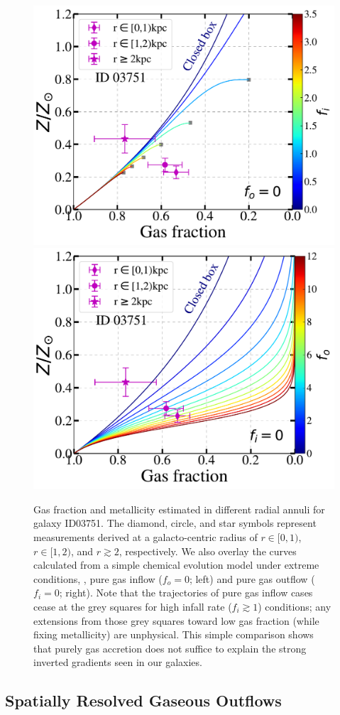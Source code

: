 \begin{figure}
    \includegraphics[width=.5\textwidth]{fig/Zerb_fgas_fixf_o.pdf}
    \includegraphics[width=.5\textwidth]{fig/Zerb_fgas_fixf_i.pdf}
    \caption[Gas fraction and metallicity estimated in different radial annuli.]
    {Gas fraction and metallicity estimated in different radial annuli for galaxy ID03751.
    The diamond, circle, and star symbols represent measurements derived at a galacto-centric radius of $r\in[0,1)$\kpc,
    $r\in[1,2)$\kpc, and $r\gtrsim2$\kpc, respectively.
    We also overlay the curves calculated from a simple chemical evolution model \cite{Erb:2008di} under extreme conditions, \ie,
    pure gas inflow ($f_o=0$; left) and pure gas outflow ($f_i=0$; right).
    Note that the trajectories of pure gas inflow cases cease at the grey squares for high infall rate ($f_i\gtrsim1$) conditions;
    any extensions from those grey squares toward low gas fraction (while fixing metallicity) are unphysical.
    This simple comparison shows that purely gas accretion does not suffice to explain the strong inverted gradients seen in our
    galaxies.
    \label{fig:Zerb_fgas}}
\end{figure}

\subsection{Spatially Resolved Gaseous Outflows}\label{sect:regulator}


